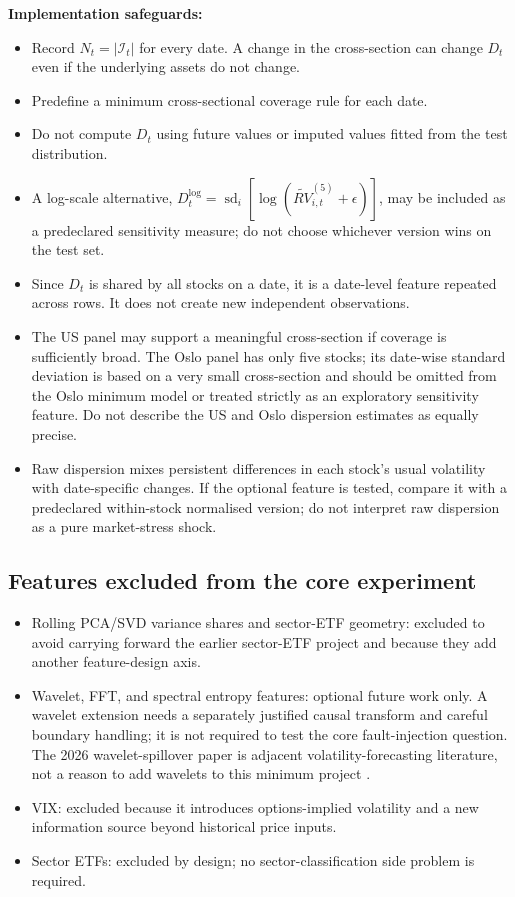 \documentclass[11pt,a4paper]{article}
\newcommand{\sd}{\operatorname{sd}}
\begin{document}
\textbf{Implementation safeguards:}
\begin{itemize}
  \item Record $N_t=|\mathcal{I}_t|$ for every date. A change in the cross-section can change $D_t$ even if the underlying assets do not change.
  \item Predefine a minimum cross-sectional coverage rule for each date.
  \item Do not compute $D_t$ using future values or imputed values fitted from the test distribution.
  \item A log-scale alternative, $D_t^{\log}=\sd_i[\log(\widetilde{RV}_{i,t}^{(5)}+\epsilon)]$, may be included as a predeclared sensitivity measure; do not choose whichever version wins on the test set.
  \item Since $D_t$ is shared by all stocks on a date, it is a date-level feature repeated across rows. It does not create new independent observations.
  \item The US panel may support a meaningful cross-section if coverage is sufficiently broad. The Oslo panel has only five stocks; its date-wise standard deviation is based on a very small cross-section and should be omitted from the Oslo minimum model or treated strictly as an exploratory sensitivity feature. Do not describe the US and Oslo dispersion estimates as equally precise.
  \item Raw dispersion mixes persistent differences in each stock's usual volatility with date-specific changes. If the optional feature is tested, compare it with a predeclared within-stock normalised version; do not interpret raw dispersion as a pure market-stress shock.
\end{itemize}

\subsection{Features excluded from the core experiment}

\begin{itemize}
  \item Rolling PCA/SVD variance shares and sector-ETF geometry: excluded to avoid carrying forward the earlier sector-ETF project and because they add another feature-design axis.
  \item Wavelet, FFT, and spectral entropy features: optional future work only. A wavelet extension needs a separately justified causal transform and careful boundary handling; it is not required to test the core fault-injection question. The 2026 wavelet-spillover paper is adjacent volatility-forecasting literature, not a reason to add wavelets to this minimum project \cite{LiuWavelet2026}.
  \item VIX: excluded because it introduces options-implied volatility and a new information source beyond historical price inputs.
  \item Sector ETFs: excluded by design; no sector-classification side problem is required.
\end{itemize}
\end{document}
